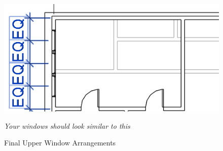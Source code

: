 \documentclass{tufte-book} %
\begin{document}
\begin{enumerate}
		\begin{figure}
			\includegraphics[width=\linewidth]{revitupperwindowfinal.png}
			\caption{Final Upper Window Arrangements}
			\emph{Your windows should look similar to this}
			\label{fig:revupperwindowfinal}
		\end{figure}
\end{enumerate}
		
\end{document}
